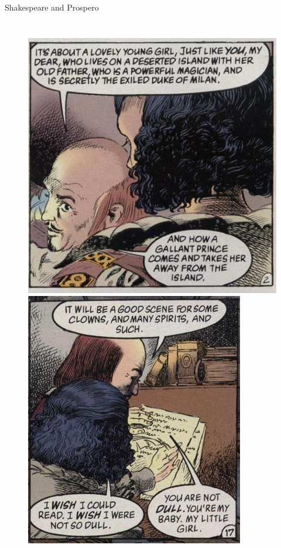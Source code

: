 \documentclass{beamer}
\begin{document}
  \begin{frame}{Shakespeare and Prospero}
    \begin{columns}[c]
      \begin{figure}[htp]
        \begin{center}
          \centering
          \includegraphics[scale=0.35]{judith.jpg}
          \includegraphics[scale=0.35]{judith2.jpg}
        \end{center}
      \end{figure}
      

\end{columns}
\end{frame}
\end{document}
